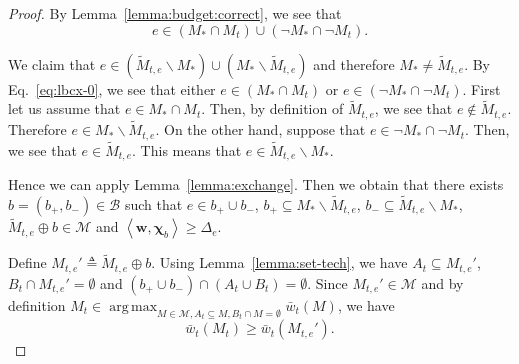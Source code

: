 \documentclass{article}
\newcommand{\M}{\mathcal M}
\newcommand{\B}{\mathcal B}
\newcommand{\del}{\backslash}
\DeclareMathOperator*{\argmax}{arg\,max}
\newcommand{\inn}[1]{\left\langle #1 \right\rangle}
\renewcommand{\vec}[1]{\boldsymbol{#1}}
\begin{document}
\begin{proof}
By Lemma~\ref{lemma:budget:correct}, we see that 
\begin{equation}
\label{eq:lbcx-0}
e \in (M_* \cap M_t) \cup ( \neg M_* \cap \neg M_t).
\end{equation}

We claim that $e\in (\tilde M_{t,e} \del M_*) \cup (M_* \del \tilde M_{t,e})$ and therefore $M_* \not= \tilde M_{t,e}$.
By Eq.~\eqref{eq:lbcx-0}, we see that either $e\in (M_* \cap M_t)$ or $e\in (\neg M_* \cap \neg M_t)$.
First let us assume that $e\in M_*\cap M_t$.
Then, by definition of $\tilde M_{t,e}$, we see that $e\not\in \tilde M_{t,e}$. Therefore $e\in M_* \del \tilde M_{t,e}$.
On the other hand, suppose that $e\in \neg M_* \cap \neg M_t$.
Then, we see that $e\in \tilde M_{t,e}$. This means that $e \in \tilde M_{t,e}\del M_*$.

Hence we can apply Lemma~\ref{lemma:exchange}. Then we obtain that there exists $b=(b_+,b_-)\in \B$ such that 
$e\in b_+\cup b_-$, $b_+\subseteq M_* \del \tilde M_{t,e}$, $b_- \subseteq \tilde M_{t,e} \del M_*$, $\tilde M_{t,e} \oplus b \in \M$ and 
$\inn{\vec w, \vec\chi_b} \ge \Delta_e$.

Define $M_{t,e}' \triangleq \tilde M_{t,e}\oplus b$. 
Using Lemma~\ref{lemma:set-tech}, we have 
$A_t \subseteq M_{t,e}'$, $B_t \cap M_{t,e}' = \emptyset$ and $(b_+\cup b_-) \cap (A_t \cup B_t) = \emptyset$.
Since $M_{t,e}'\in \M$ and by definition $M_t \in \argmax_{M\in \M, A_t\subseteq M, B_t \cap M = \emptyset} \bar w_t(M)$, we have
\begin{equation}
\label{eq:lbcx-1}
\bar w_t(M_t) \ge \bar w_t(M_{t,e}').
\end{equation}


\end{proof}
\end{document}
